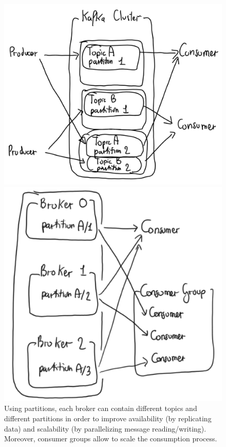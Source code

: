 \documentclass[10pt,a4paper]{article}
\begin{document}
\begin{figure}[h!]
\centering
\begin{minipage}{.5\textwidth}
  \centering
  \includegraphics[width=.9\linewidth]{images/kafka-topics-partitions}
\end{minipage}%
\begin{minipage}{.5\textwidth}
  \centering
  \includegraphics[width=.9\linewidth]{images/kafka-consumer-group}
\end{minipage}
	\caption{Using partitions, each broker can contain different topics and different partitions in order to improve availability (by replicating data) and scalability (by parallelizing message reading/writing). Moreover, consumer groups allow to scale the consumption process.}
\end{figure} 
\end{document}
